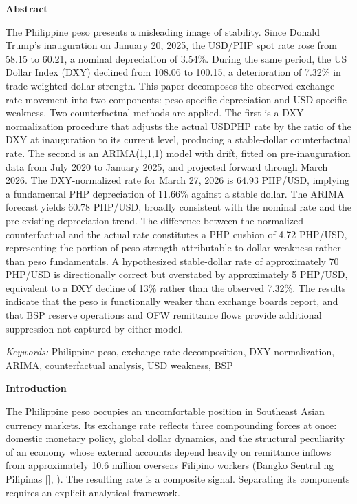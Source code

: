 \documentclass[12pt]{article}
\begin{document}
\newpage
\begin{center}
  \textbf{Abstract}
\end{center}

The Philippine peso presents a misleading image of stability. Since Donald Trump's
inauguration on January 20, 2025, the USD/PHP spot rate rose from 58.15 to 60.21,
a nominal depreciation of 3.54\%. During the same period, the US Dollar Index
(DXY) declined from 108.06 to 100.15, a deterioration of 7.32\% in trade-weighted
dollar strength. This paper decomposes the observed exchange rate movement into
two components: peso-specific depreciation and USD-specific weakness. Two
counterfactual methods are applied. The first is a DXY-normalization procedure
that adjusts the actual USDPHP rate by the ratio of the DXY at inauguration to its
current level, producing a stable-dollar counterfactual rate. The second is an
ARIMA(1,1,1) model with drift, fitted on pre-inauguration data from July 2020 to
January 2025, and projected forward through March 2026. The DXY-normalized rate
for March 27, 2026 is 64.93 PHP/USD, implying a fundamental PHP depreciation of
11.66\% against a stable dollar. The ARIMA forecast yields 60.78 PHP/USD, broadly
consistent with the nominal rate and the pre-existing depreciation trend. The
difference between the normalized counterfactual and the actual rate constitutes a
PHP cushion of 4.72 PHP/USD, representing the portion of peso strength attributable
to dollar weakness rather than peso fundamentals. A hypothesized stable-dollar rate
of approximately 70 PHP/USD is directionally correct but overstated by approximately
5 PHP/USD, equivalent to a DXY decline of 13\% rather than the observed 7.32\%.
The results indicate that the peso is functionally weaker than exchange boards report,
and that BSP reserve operations and OFW remittance flows provide additional suppression
not captured by either model.

\vspace{12pt}
\noindent\textit{Keywords:} Philippine peso, exchange rate decomposition, DXY
normalization, ARIMA, counterfactual analysis, USD weakness, BSP

\newpage

\begin{center}
  \textbf{\large Introduction}
\end{center}

\vspace{12pt}

The Philippine peso occupies an uncomfortable position in Southeast Asian currency
markets. Its exchange rate reflects three compounding forces at once: domestic monetary
policy, global dollar dynamics, and the structural peculiarity of an economy whose
external accounts depend heavily on remittance inflows from approximately 10.6 million
overseas Filipino workers (Bangko Sentral ng Pilipinas [\citeauthor{bsp2024}], \citeyear{bsp2024}).
The resulting rate is a composite signal. Separating its components requires an explicit
analytical framework.
\end{document}
